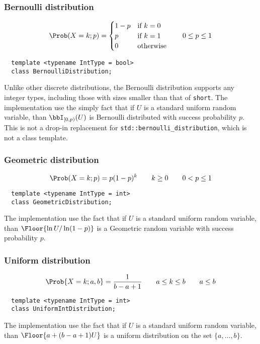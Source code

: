 \subsubsection{Bernoulli distribution}

\begin{equation*}
  \Prob(X = k;p) = \begin{cases}
    1 - p &\text{if } k = 0\\
    p     &\text{if } k = 1 \\
    0     &\text{otherwise}
  \end{cases}
  \qquad 0 \le p \le 1
\end{equation*}
\begin{Verbatim}
  template <typename IntType = bool>
  class BernoulliDistribution;
\end{Verbatim}
Unlike other discrete distributions, the Bernoulli distribution supports any
integer types, including those with sizes smaller than that of \verb|short|.
The implementation use the simply fact that if $U$ is a standard uniform random
variable, than $\bbI_{[0,p)}(U)$ is Bernoulli distributed with success
probability $p$. This is not a drop-in replacement for
\verb|std::bernoulli_distribution|, which is not a class template.

\subsubsection{Geometric distribution}

\begin{equation*}
  \Prob(X = k;p) = p(1-p)^k
  \qquad k \ge 0
  \qquad 0 < p \le 1
\end{equation*}
\begin{Verbatim}
  template <typename IntType = int>
  class GeometricDistribution;
\end{Verbatim}
The implementation use the fact that if $U$ is a standard uniform random
variable, than $\Floor{\ln U / \ln(1-p)}$ is a Geometric random variable with
success probability $p$.

\subsubsection{Uniform distribution}

\begin{equation*}
  \Prob{X = k;a,b} = \frac{1}{b - a + 1}
  \qquad a \le k \le b
  \qquad a \le b
\end{equation*}
\begin{Verbatim}
  template <typename IntType = int>
  class UniformIntDistribution;
\end{Verbatim}
The implementation use the fact that if $U$ is a standard uniform random
variable, than $\Floor{a + (b - a + 1) U}$ is a uniform distribution on the set
$\{a,\dots,b\}$.

